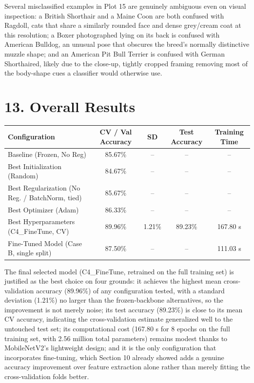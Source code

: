 \documentclass[10pt]{article}
\begin{document}
Several misclassified examples in Plot 15 are genuinely ambiguous even on
visual inspection: a British Shorthair and a Maine Coon are both confused
with Ragdoll, cats that share a similarly rounded face and dense grey/cream
coat at this resolution; a Boxer photographed lying on its back is confused
with American Bulldog, an unusual pose that obscures the breed's normally
distinctive muzzle shape; and an American Pit Bull Terrier is confused with
German Shorthaired, likely due to the close-up, tightly cropped framing
removing most of the body-shape cues a classifier would otherwise use.

\section*{13. Overall Results}

\begin{center}
\begin{tabular}{|p{5.2cm}|c|c|c|c|}
\hline
Configuration & CV / Val Accuracy & SD & Test Accuracy & Training Time\\
\hline
Baseline (Frozen, No Reg) & 85.67\% & -- & -- & --\\
Best Initialization (Random) & 84.67\% & -- & -- & --\\
Best Regularization (No Reg. / BatchNorm, tied) & 85.67\% & -- & -- & --\\
Best Optimizer (Adam) & 86.33\% & -- & -- & --\\
Best Hyperparameters (C4\_FineTune, CV) & 89.96\% & 1.21\% & 89.23\% & 167.80 s\\
Fine-Tuned Model (Case B, single split) & 87.50\% & -- & -- & 111.03 s\\
\hline
\end{tabular}
\end{center}

The final selected model (C4\_FineTune, retrained on the full training set)
is justified as the best choice on four grounds: it achieves the highest
mean cross-validation accuracy (89.96\%) of any configuration tested, with
a standard deviation (1.21\%) no larger than the frozen-backbone
alternatives, so the improvement is not merely noise; its test accuracy
(89.23\%) is close to its mean CV accuracy, indicating the cross-validation
estimate generalized well to the untouched test set; its computational cost
(167.80 s for 8 epochs on the full training set, with 2.56 million total
parameters) remains modest thanks to MobileNetV2's lightweight design; and
it is the only configuration that incorporates fine-tuning, which Section
10 already showed adds a genuine accuracy improvement over feature
extraction alone rather than merely fitting the cross-validation folds
better.
\end{document}
